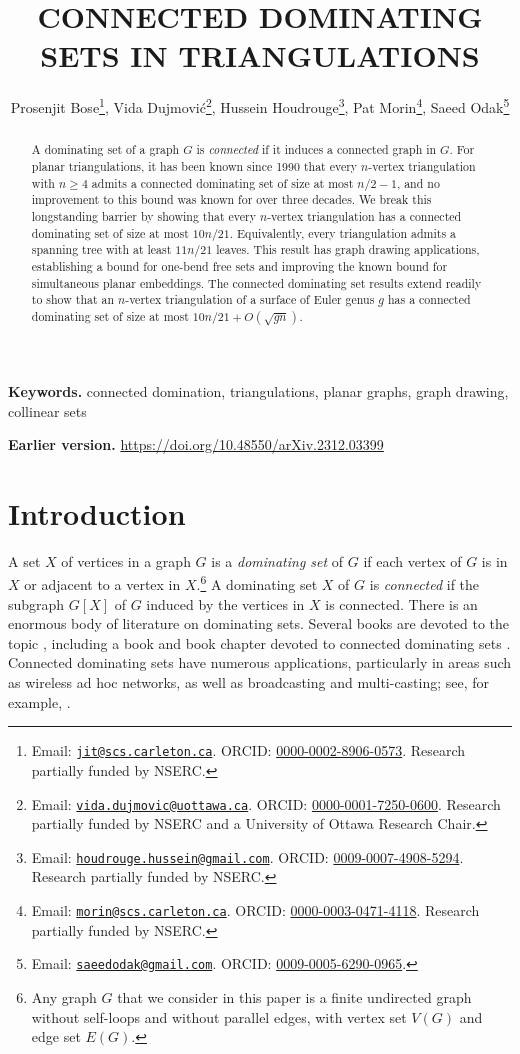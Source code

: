\documentclass{patmorin}
\title{\MakeUppercase{Connected Dominating Sets in Triangulations}}
\author{Prosenjit Bose\thanks{Email: \href{mailto:jit@scs.carleton.ca}{\texttt{jit@scs.carleton.ca}}. ORCID: \href{https://orcid.org/0000-0002-8906-0573}{0000-0002-8906-0573}. Research partially funded by NSERC.}, \quad
Vida Dujmovi\'c\thanks{Email: \href{mailto:vida.dujmovic@uottawa.ca}{\texttt{vida.dujmovic@uottawa.ca}}. ORCID: \href{https://orcid.org/0000-0001-7250-0600}{0000-0001-7250-0600}. Research partially funded by NSERC and a University of Ottawa Research Chair.}, \quad
Hussein Houdrouge\thanks{Email: \href{mailto:houdrouge.hussein@gmail.com}{\texttt{houdrouge.hussein@gmail.com}}. ORCID: \href{https://orcid.org/0009-0007-4908-5294}{0009-0007-4908-5294}. Research partially funded by NSERC.}, \quad
Pat Morin\thanks{Email: \href{mailto:morin@scs.carleton.ca}{\texttt{morin@scs.carleton.ca}}. ORCID: \href{https://orcid.org/0000-0003-0471-4118}{0000-0003-0471-4118}. Research partially funded by NSERC.}, \quad
Saeed Odak\thanks{Email: \href{mailto:saeedodak@gmail.com}{\texttt{saeedodak@gmail.com}}. ORCID: \href{https://orcid.org/0009-0005-6290-0965}{0009-0005-6290-0965}.}}
\date{}
\newcommand{\defin}[1]{\emph{\textcolor{brightmaroon}{#1}}}
\begin{document}
\maketitle

\begin{abstract}
A dominating set of a graph $G$ is \emph{connected} if it induces a connected graph in $G$. For planar triangulations, it has been known since 1990 that every $n$-vertex triangulation with $n\ge4$ admits a connected dominating set of size at most $n/2 - 1$, and no improvement to this bound was known for over three decades. We break this longstanding barrier by showing that every $n$-vertex triangulation has a connected dominating set of size at most $10n/21$. Equivalently, every triangulation admits a spanning tree with at least $11n/21$ leaves. 
This result has graph drawing applications, establishing a bound for one-bend free sets and improving the known bound for simultaneous planar embeddings. 
The connected dominating set results extend readily to show that an $n$-vertex triangulation of a surface of Euler genus $g$ has a connected dominating set of size at most $10n/21+O(\sqrt{gn})$.
\end{abstract}

{\small
\noindent\textbf{Keywords.} connected domination, triangulations, planar graphs, graph drawing, collinear sets
\par\smallskip
\noindent\textbf{Earlier version.} \url{https://doi.org/10.48550/arXiv.2312.03399}
\par}
\medskip


\section{Introduction}
A set $X$ of vertices in a graph $G$ is a \defin{dominating set} of $G$ if each vertex of $G$ is in $X$ or adjacent to a vertex in $X$.\footnote{Any graph $G$ that we consider in this paper is a finite undirected graph without self-loops and without parallel edges, with vertex set $V(G)$ and edge set $E(G)$.}  A dominating set $X$ of $G$ is \defin{connected} if the subgraph $G[X]$ of $G$ induced by the vertices in $X$ is connected.  There is an enormous body of literature on dominating sets. Several books are devoted to the topic \cite{haynes.hedetniemi.ea:domination,haynes.hedetniemi.ea:topics,du.wan:connected,haynes.hedetniemi.ea:vol2}, including a book and book chapter devoted to connected dominating sets \cite{du.wan:connected,chellali.favaron:connected}. Connected dominating sets have numerous applications, particularly in areas such as wireless ad hoc networks, as well as broadcasting and multi-casting; see, for example, \cite{wu:dominating}.
\end{document}
